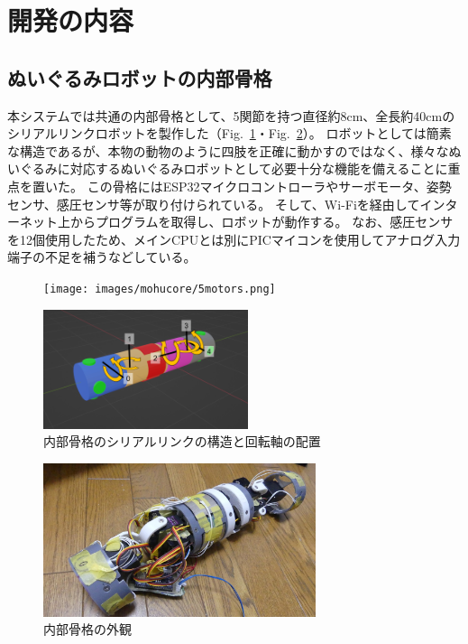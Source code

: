 \documentclass[uplatex,a4paper,12pt]{jsarticle}
\renewcommand{\figurename}{Fig.}
\newcommand{\figref}[1]{\figurename~\ref{#1}}
\begin{document}
\section{開発の内容}
\subsection{ぬいぐるみロボットの内部骨格}
本システムでは共通の内部骨格として、5関節を持つ直径約8cm、全長約40cmのシリアルリンクロボットを製作した（\figref{fig:mohucore:serial_link}・\figref{fig:mohucore:skeleton}）。
ロボットとしては簡素な構造であるが、本物の動物のように四肢を正確に動かすのではなく、様々なぬいぐるみに対応するぬいぐるみロボットとして必要十分な機能を備えることに重点を置いた。
この骨格にはESP32マイクロコントローラやサーボモータ、姿勢センサ、感圧センサ等が取り付けられている。
そして、Wi-Fiを経由してインターネット上からプログラムを取得し、ロボットが動作する。
なお、感圧センサを12個使用したため、メインCPUとは別にPICマイコンを使用してアナログ入力端子の不足を補うなどしている。

\begin{figure}[htbp]
  \centering
  \begin{minipage}[c]{0.48\linewidth}
    \centering
    \texttt{[image: images/mohucore/5motors.png]}
  \end{minipage}
  \begin{minipage}[c]{0.48\linewidth}
    \centering
    \includegraphics[keepaspectratio,width=6cm,clip]{images/mohucore/rot_arrangement.png}
  \end{minipage}
  \caption{内部骨格のシリアルリンクの構造と回転軸の配置}
  \label{fig:mohucore:serial_link}
\end{figure}



\begin{figure}[htbp]
  \centering
  \includegraphics[width=8cm]{images/mohucore/skeleton.jpg}
  \caption{内部骨格の外観}
  \label{fig:mohucore:skeleton}
\end{figure}
\end{document}
